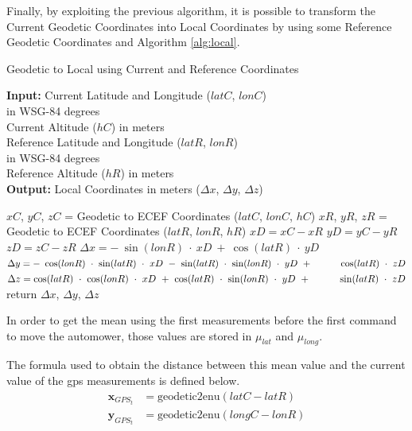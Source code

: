 Finally, by exploiting the previous algorithm, it is possible to transform the Current Geodetic Coordinates into Local Coordinates by using some Reference Geodetic Coordinates and Algorithm \ref{alg:local}.
\begin{algorithm}[ht!]
\caption{Geodetic to Local using Current and Reference Coordinates}
\label{alg:local}
    \hspace*{\algorithmicindent} \textbf{Input:} Current Latitude and Longitude ($latC$, $lonC$)\\
        \hspace*{5em} in WSG-84 degrees\\
    \hspace*{4em} Current Altitude ($hC$) in meters\\
    \hspace*{4em} Reference Latitude and Longitude ($latR$, $lonR$)\\
        \hspace*{5em} in WSG-84 degrees\\
    \hspace*{4em} Reference Altitude ($hR$) in meters \\
    \hspace*{\algorithmicindent} \textbf{Output:} Local Coordinates in meters ($\Delta x$, $\Delta y$, $\Delta z$)
  \begin{algorithmic}[1]
    \STATE $xC$, $yC$, $zC$ = Geodetic to ECEF Coordinates ($latC$, $lonC$, $hC$)
    \STATE $xR$, $yR$, $zR$ = Geodetic to ECEF Coordinates ($latR$, $lonR$, $hR$)
    \STATE $xD = xC - xR$
    \STATE $yD = yC - yR$
    \STATE $zD = zC - zR$
    \STATE $\Delta x = -~\sin(lonR)~\cdot~xD~+~\cos(latR)~\cdot~yD$
    \STATE $\Delta y = -~\cos(lonR)~\cdot~\sin(latR)~\cdot~xD~-~\sin(latR)~\cdot~\sin(lonR)~\cdot~yD~+ \hspace*{3em} \cos(latR)~\cdot~zD$
    \STATE $\Delta z = \cos(latR)~\cdot~\cos(lonR)~\cdot~xD~+~\cos(latR)~\cdot~\sin(lonR)~\cdot~yD~+  \hspace*{3em} \sin(latR)~\cdot~zD$
    \STATE return $\Delta x$, $\Delta y$, $\Delta z$
    \end{algorithmic}

\end{algorithm}

In order to get the mean using the first measurements before the first command to move the automower, those values are stored in $\mu_{lat}$ and $\mu_{long}$.

The formula used to obtain the distance between this mean value and the current value of the gps measurements is defined below.
\begin{align}
\mathbf{x}_{GPS_t} & = \text{geodetic2enu}( latC - latR)\\
\mathbf{y}_{GPS_t} & = \text{geodetic2enu}( longC - lonR)
\end{align}

